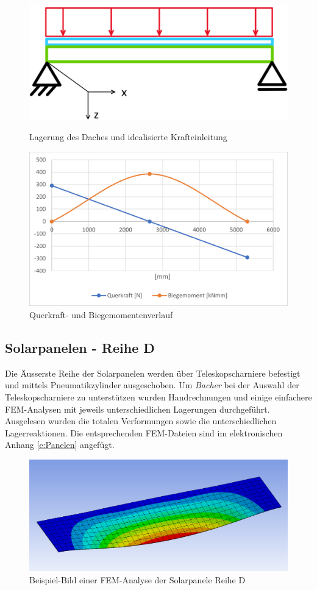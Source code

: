 \begin{figure}[h]
\centering
\begin{minipage}{.4\textwidth}
  \centering
  \includegraphics[width=.98\linewidth]{04_figures/Dach Idealisierung.png}
  \caption{Lagerung des Daches und idealisierte Krafteinleitung}
  \label{Dach Idealisierung}
\end{minipage}%
\begin{minipage}{.6\textwidth}
  \centering
  \includegraphics[width=.98\linewidth]{04_figures/Dach QM.png}
  \caption{Querkraft- und Biegemomentenverlauf}
  \label{Dach QM}
\end{minipage}
\end{figure}


\subsection{Solarpanelen - Reihe D}
Die Äusserste Reihe der Solarpanelen werden über Teleskopscharniere befestigt und mittels Pneumatikzylinder ausgeschoben. Um \emph{Bacher} bei der Auswahl der Teleskopscharniere zu unterstützen wurden Handrechnungen und einige einfachere FEM-Analysen mit jeweils unterschiedlichen Lagerungen durchgeführt. Ausgelesen wurden die totalen Verformungen sowie die unterschiedlichen Lagerreaktionen. Die entsprechenden FEM-Dateien sind im elektronischen Anhang \ref{e:Panelen} angefügt.

\begin{figure}[h]
  \centering
  \includegraphics[width=.6\linewidth]{04_figures/Panelen Verformung.png}
  \caption{Beispiel-Bild einer FEM-Analyse der Solarpanele Reihe D}
  \label{Panelen Verformung}
\end{figure}
\newpage
